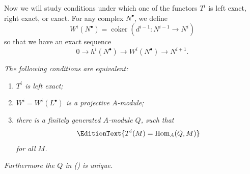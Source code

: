 {\medskip
Now we will study conditions under which one of the functors $T^i$ is left exact, right exact, or exact. For any complex $N^\bullet$, we define
\[
 W^i(N^\bullet)=\operatorname{coker}(d^{i-1}\colon N^{i-1}\to N^i)
\]
so that we have an exact sequence
\[
 0\to h^i(N^\bullet)\to W^i(N^\bullet)\to N^{i+1}.
\]

 \emph{The following conditions are equivalent:}
\begin{enumerate}[label=(\roman*),leftmargin=2.5em,itemsep=0pt,topsep=1pt,parsep=0pt]
\item\hypertarget{result-III-12.4i}{} \emph{$T^i$ is left exact;}
\item\hypertarget{result-III-12.4ii}{} \emph{$W^i=W^i(L^\bullet)$ is a projective $A$-module;}
\item\hypertarget{result-III-12.4iii}{} \emph{there is a finitely generated $A$-module $Q$, such that}
\[
 \EditionText{T^i(M)=\operatorname{Hom}_A(Q,M)}
\]
\emph{for all $M$\EditionText{}.}
\end{enumerate}
\emph{Furthermore the $Q$ in () is unique\EditionText{}.}
}
